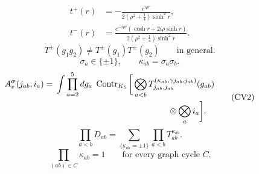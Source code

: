 \documentclass{article}
\newcommand{\Contr}{\operatorname{Contr}}
\begin{document}
\begin{equation}
\begin{aligned}
t^+(r)&=-\frac{e^{i\rho r}}{2(\rho^2+\tfrac14)\sinh^2r},\\
t^-(r)&=\frac{e^{-i\rho r}(\cosh r+2i\rho\sinh r)}{2(\rho^2+\tfrac14)\sinh^2r}.
\end{aligned}
\tag{Q10}
\end{equation}
\begin{equation}
T^\pm(g_1g_2)\ne T^\pm(g_1)T^\pm(g_2)\qquad\text{in general}.
\tag{Q11}
\end{equation}
\begin{equation}
\sigma_a\in\{\pm1\},\qquad\kappa_{ab}=\sigma_a\sigma_b.
\tag{CV1}
\end{equation}
\begin{equation}
\begin{aligned}
A_v^{\boldsymbol\sigma}(j_{ab},i_a)={}&\int\prod_{a=2}^5dg_a\;\Contr_{K_5}\bigg[\bigotimes_{a<b}
T^{(\kappa_{ab},\gamma j_{ab},j_{ab})}_{j_{ab},j_{ab}}(g_{ab})\\
&\hspace{47mm}\otimes\bigotimes_ai_a\bigg].
\end{aligned}
\tag{CV2}
\end{equation}
\begin{equation}
\prod_{a<b}D_{ab}=\sum_{\{\kappa_{ab}=\pm1\}}\prod_{a<b}T_{ab}^{\kappa_{ab}}.
\tag{CV3}
\end{equation}
\begin{equation}
\prod_{(ab)\in C}\kappa_{ab}=1\qquad\text{for every graph cycle }C.
\tag{CV4}
\end{equation}
\end{document}
